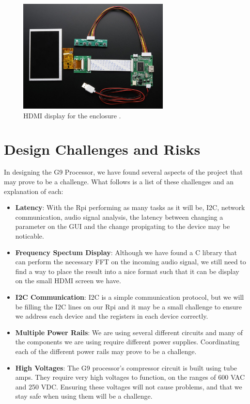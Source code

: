 \documentclass[journal]{IEEEtran}
\begin{document}
	
	\begin{figure}
		\centering
		\includegraphics[width=3in]{hdmiDisplay}
		\caption{HDMI display for the enclosure \cite{hdmiDisplay}. }
		\label{fig:hdmiDisplay}
	\end{figure}

	    
	\section{Design Challenges and Risks}
	In designing the G9 Processor, we have found several aspects of the project that may prove to be a challenge.  What follows is a list of these challenges and an explanation of each:
	\begin{itemize}
		\item \textbf{Latency}: With the Rpi performing as many tasks as it will be, I2C, network communication, audio signal analysis, the latency between changing a parameter on the GUI and the change propigating to the device may be noticable.
		\item \textbf{Frequency Spectum Display}: Although we have found a C library that can perform the necessary FFT on the incoming audio signal, we still need to find a way to place the result into a nice format such that it can be display on the small HDMI screen we have.
		\item \textbf{I2C Communication}: I2C is a simple communication protocol, but we will be filling the I2C lines on our Rpi and it may be a small challenge to ensure we address each device and the registers in each device correctly.
		\item \textbf{Multiple Power Rails}: We are using several different circuits and many of the components we are using require different power supplies.  Coordinating each of the different power rails may prove to be a challenge.
		\item \textbf{High Voltages}: The G9 processor's compressor circuit is built using tube amps.  They require very high voltages to function, on the ranges of 600 VAC and 250 VDC.  Ensuring these voltages will not cause problems, and that we stay safe when using them will be a challenge.
	\end{itemize}
	
\end{document}
